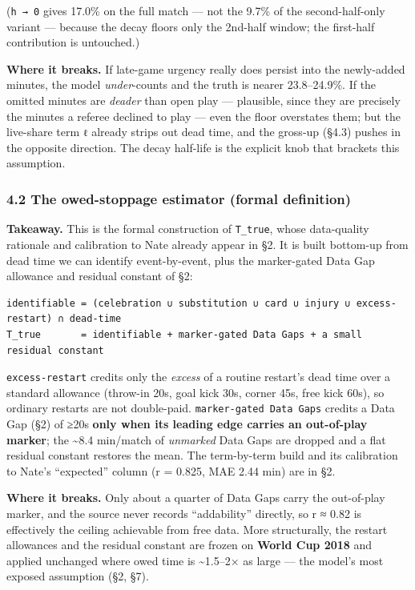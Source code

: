 \documentclass[
]{article}
\begin{document}
(\texttt{h\ →\ 0} gives 17.0\% on the full match --- not the 9.7\% of
the second-half-only variant --- because the decay floors only the
2nd-half window; the first-half contribution is untouched.)

\textbf{Where it breaks.} If late-game urgency really does persist into
the newly-added minutes, the model \emph{under}-counts and the truth is
nearer 23.8--24.9\%. If the omitted minutes are \emph{deader} than open
play --- plausible, since they are precisely the minutes a referee
declined to play --- even the floor overstates them; but the live-share
term \texttt{ℓ} already strips out dead time, and the gross-up (§4.3)
pushes in the opposite direction. The decay half-life is the explicit
knob that brackets this assumption.

\subsubsection{4.2 The owed-stoppage estimator (formal
definition)}\label{the-owed-stoppage-estimator-formal-definition}

\textbf{Takeaway.} This is the formal construction of \texttt{T\_true},
whose data-quality rationale and calibration to Nate already appear in
§2. It is built bottom-up from dead time we can identify event-by-event,
plus the marker-gated Data Gap allowance and residual constant of §2:

\begin{verbatim}
identifiable = (celebration ∪ substitution ∪ card ∪ injury ∪ excess-restart) ∩ dead-time
T_true       = identifiable + marker-gated Data Gaps + a small residual constant
\end{verbatim}

\texttt{excess-restart} credits only the \emph{excess} of a routine
restart's dead time over a standard allowance (throw-in 20s, goal kick
30s, corner 45s, free kick 60s), so ordinary restarts are not
double-paid. \texttt{marker-gated\ Data\ Gaps} credits a Data Gap (§2)
of ≥20s \textbf{only when its leading edge carries an out-of-play
marker}; the \textasciitilde8.4 min/match of \emph{unmarked} Data Gaps
are dropped and a flat residual constant restores the mean. The
term-by-term build and its calibration to Nate's ``expected'' column (r
= 0.825, MAE 2.44 min) are in §2.

\textbf{Where it breaks.} Only about a quarter of Data Gaps carry the
out-of-play marker, and the source never records ``addability''
directly, so r ≈ 0.82 is effectively the ceiling achievable from free
data. More structurally, the restart allowances and the residual
constant are frozen on \textbf{World Cup 2018} and applied unchanged
where owed time is \textasciitilde1.5--2× as large --- the model's most
exposed assumption (§2, §7).
\end{document}
